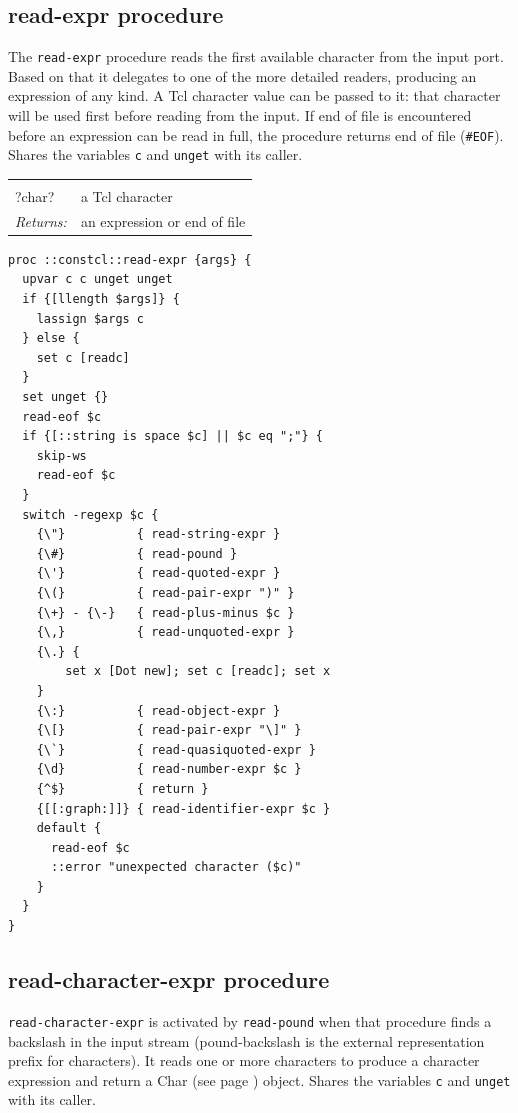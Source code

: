 \documentclass[twoside,9pt]{report}
\begin{document}
\subsection{read-expr procedure}
\label{read-expr-procedure}


The \texttt{read-expr} procedure reads the first available character from the input port. Based on that it delegates to one of the more detailed readers, producing an expression of any kind. A Tcl character value can be passed to it: that character will be used first before reading from the input. If end of file is encountered before an expression can be read in full, the procedure returns end of file (\texttt{\#EOF}). Shares the variables \texttt{c} and \texttt{unget} with its caller.

\noindent\begin{tabular}{ |p{1.9cm} p{8cm}| }
\hline
\rowcolor[HTML]{CCCCCC} \multicolumn{2}{|l|}{\bf read-expr (internal)} \\
?char? & a Tcl character \\
\textit{Returns:} & an expression or end of file \\
\hline
\end{tabular}
\begin{lstlisting}
proc ::constcl::read-expr {args} {
  upvar c c unget unget
  if {[llength $args]} {
    lassign $args c
  } else {
    set c [readc]
  }
  set unget {}
  read-eof $c
  if {[::string is space $c] || $c eq ";"} {
    skip-ws
    read-eof $c
  }
  switch -regexp $c {
    {\"}          { read-string-expr }
    {\#}          { read-pound }
    {\'}          { read-quoted-expr }
    {\(}          { read-pair-expr ")" }
    {\+} - {\-}   { read-plus-minus $c }
    {\,}          { read-unquoted-expr }
    {\.} {
        set x [Dot new]; set c [readc]; set x
    }
    {\:}          { read-object-expr }
    {\[}          { read-pair-expr "\]" }
    {\`}          { read-quasiquoted-expr }
    {\d}          { read-number-expr $c }
    {^$}          { return }
    {[[:graph:]]} { read-identifier-expr $c }
    default {
      read-eof $c
      ::error "unexpected character ($c)"
    }
  }
}
\end{lstlisting}
\subsection{read-character-expr procedure}
\label{read-character-expr-procedure}


\texttt{read-character-expr} is activated by \texttt{read-pound} when that procedure finds a backslash in the input stream (pound-backslash is the external representation prefix for characters). It reads one or more characters to produce a character expression and return a Char (see page \pageref{characters}) object. Shares the variables \texttt{c} and \texttt{unget} with its caller.
\end{document}
